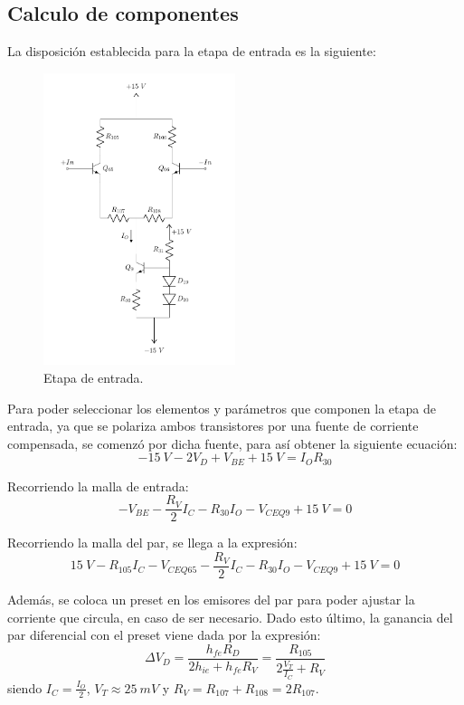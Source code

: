 \subsection{Calculo de componentes}
La disposición establecida para la etapa de entrada es la siguiente:
\begin{figure}[H]
\centering
	\includegraphics[width=0.5\textwidth, page=1]{ImagenesInput-Stage/Input.pdf}
	\caption{Etapa de entrada.}
	\label{fig:input}
\end{figure}

Para poder seleccionar los elementos y parámetros que componen la etapa de entrada, ya que se polariza ambos transistores por una fuente de corriente compensada, se comenzó por dicha fuente, para así obtener la siguiente ecuación:
\begin{equation}
	-15 \ V - 2V_{D} + V_{BE} + 15 \ V = I_O R_{30} 
\end{equation}

Recorriendo la malla de entrada:
\begin{equation}
	- V_{BE} - \frac{R_V}{2} I_C - R_{30} I_O - V_{CEQ9} + 15 \ V = 0
\end{equation}

Recorriendo la malla del par, se llega a la expresión:
\begin{equation}
	15 \ V - R_{105} I_C - V_{CEQ65} - \frac{R_V}{2} I_C - R_{30} I_O - V_{CEQ9} + 15 \ V = 0
\end{equation}

Además, se coloca un preset en los emisores del par para poder ajustar la corriente que circula, en caso de ser necesario. Dado esto último, la ganancia del par diferencial con el preset viene dada por la expresión:
\begin{equation}
	\Delta V_D = \frac{h_{fe} R_D}{2 h_{ie} + h_{fe} R_V} = \frac{R_{105}}{2 \frac{V_T}{I_C} + R_V}
\end{equation}
siendo $I_C = \frac{I_O}{2}$, $V_T \approx 25 \ mV$ y $R_V = R_{107} + R_{108} = 2 R_{107} $.

